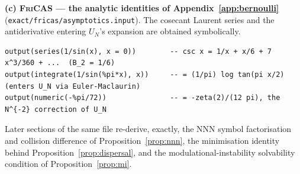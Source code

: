 \documentclass[11pt,reqno]{amsart}
\theoremstyle{plain}
\theoremstyle{definition}
\begin{document}
\smallskip\noindent\textbf{(c) \textsc{FriCAS} --- the analytic identities of Appendix~\ref{app:bernoulli}}
(\texttt{exact/fricas/asymptotics.input}). The cosecant Laurent series and the antiderivative entering
$U_N$'s expansion are obtained symbolically.
\begin{lstlisting}[language=FriCASlang]
output(series(1/sin(x), x = 0))        -- csc x = 1/x + x/6 + 7 x^3/360 + ...  (B_2 = 1/6)
output(integrate(1/sin(%pi*x), x))     -- = (1/pi) log tan(pi x/2)   (enters U_N via Euler-Maclaurin)
output(numeric(-%pi/72))               -- = -zeta(2)/(12 pi), the N^{-2} correction of U_N
\end{lstlisting}
Later sections of the same file re-derive, exactly, the NNN symbol factorisation and collision difference
of Proposition~\ref{prop:nnn}, the minimisation identity behind Proposition~\ref{prop:dispersal}, and the
modulational-instability solvability condition of Proposition~\ref{prop:mi}.
\end{document}
